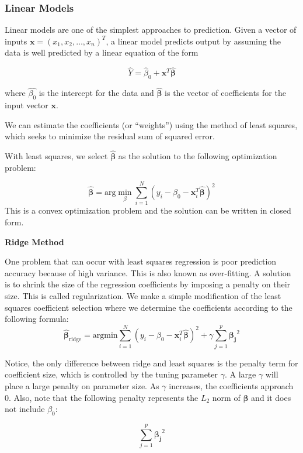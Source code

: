 \documentclass[12pt]{article}
\begin{document}
\subsubsection{Linear Models}
Linear models are one of the simplest approaches to prediction. Given a vector of inputs 
$\textbf{x} =  (x_1, x_2, \dots, x_n)^T$, a linear model predicts output by assuming the data is well predicted by a linear equation of the form 

$$\hat{Y} = \hat{\beta}_0 + \textbf{x}^T \boldsymbol{\hat{\beta}}$$

where $\hat{\beta_0}$ is the intercept for the data and $\boldsymbol{\hat{\beta}}$ is the vector of coefficients for the input vector $\textbf{x}$. \cite[11]{springer} 

We can estimate the coefficients (or ``weights'') using the method of least squares, which seeks to minimize the residual sum of squared error. 

With least squares, we select $\boldsymbol{\hat{\beta}}$ as the solution to the following optimization problem:

$$\boldsymbol{\hat{\beta}} = \text{arg} \min_\beta \sum_{i=1}^{N} \left(y_i - \beta_0 - \textbf{x}_i^T \boldsymbol{\hat{\beta}} \right)^2$$
\cite[42]{springer} This is a convex optimization problem and the solution can be written in closed form.


\textbf{Ridge Method}

One problem that can occur with least squares regression is poor prediction accuracy because of high variance. \cite[55]{springer} This is also known as over-fitting. A solution is to shrink the size of the regression coefficients by imposing a penalty on their size. This is called regularization. We make a simple modification of the least squares coefficient selection where we determine the coefficients according to the following formula: 
$$\boldsymbol{\hat{\beta}}_{\text{ridge}} = \text{argmin} \sum_{i=1}^{N} (y_i - \beta_0 -\textbf{x}_i^T \boldsymbol{\hat{\beta}})^2 + \gamma \sum_{j=1}^{p} \boldsymbol{\beta_j}^2$$
\cite[59]{springer}

Notice, the only difference between ridge and least squares is the penalty term for coefficient size, which is controlled by the tuning parameter $\gamma$. A large $\gamma$ will place a large penalty on parameter size. As $\gamma$ increases, the coefficients approach 0. Also, note that the following penalty represents the $L_2$ norm of $\boldsymbol{\beta}$ and it does not include $\beta_0$:

$$ \sum_{j=1}^{p} \boldsymbol{\beta_j}^2$$
\end{document}
